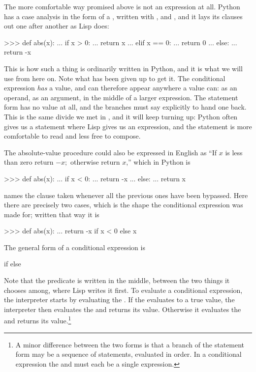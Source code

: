 The more comfortable way promised above is not an expression at all.  Python
has a case analysis in the form of a , written with
,  and , and it lays its clauses out one after
another as Lisp does:

\begin{codeBlock}
>>> def abs(x):
...     if x > 0:
...         return x
...     elif x == 0:
...         return 0
...     else:
...         return -x
\end{codeBlock}

\noindent
This is how such a thing is ordinarily written in Python, and it is what we
will use from here on.  Note what has been given up to get it.  The conditional
expression \emph{has} a value, and can therefore appear anywhere a value can:
as an operand, as an argument, in the middle of a larger expression.  The
statement form has no value at all, and the branches must say 
explicitly to hand one back.  This is the same divide we met in
, and it will keep turning up: Python often gives us a
statement where Lisp gives us an expression, and the statement is more
comfortable to read and less free to compose.

\noindent
The absolute-value procedure could also be expressed in English as ``If
\( x \) is less than zero return \( -x; \) otherwise return \( x \),'' which in
Python is

\begin{codeBlock}
>>> def abs(x):
...     if x < 0:
...         return -x
...     else:
...         return x
\end{codeBlock}

\noindent
{} names the clause taken whenever all the previous ones have been
bypassed.  Here there are precisely two cases, which is the shape the
conditional expression was made for; written that way it is

\begin{codeBlock}
>>> def abs(x):
...     return -x if x < 0 else x
\end{codeBlock}

\noindent
The general form of a conditional expression is

\begin{syntaxForm}
 if  else 
\end{syntaxForm}

\noindent
Note that the predicate is written in the middle, between the two things it
chooses among, where Lisp writes it first.  To evaluate a conditional
expression, the interpreter starts by evaluating the .  If the
 evaluates to a true value, the interpreter then evaluates the
 and returns its value.  Otherwise it evaluates the
 and returns its value.\footnote{A minor difference between
the two forms is that a branch of the statement form may be a sequence of
statements, evaluated in order.  In a conditional expression the
 and  must each be a single expression.}

